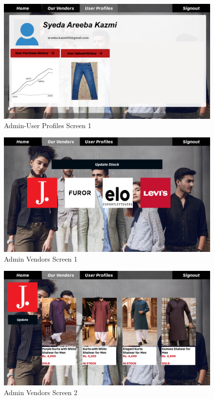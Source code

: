    \begin{figure}[H]
  \includegraphics[width=15cm]{images/Profiles2.pdf} 
  \centering
  \caption{Admin-User Profiles Screen 1}
  \label{gui:profiles2}
  \end{figure}

   \begin{figure}[H]
  \includegraphics[width=15cm]{images/VendorScreen1.pdf} 
  \centering
  \caption{Admin Vendors Screen 1}
  \label{gui:vendor1}
  \end{figure}

   \begin{figure}[H]
  \includegraphics[width=15cm]{images/VendorScreen2.pdf} 
  \centering
  \caption{Admin Vendors Screen 2}
  \label{gui:vendor2}
  \end{figure}


